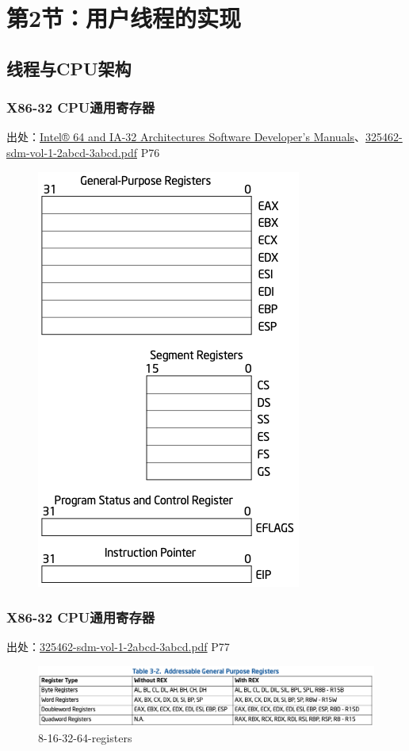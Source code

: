 \section{第2节：用户线程的实现}%
% 
\subsection{线程与CPU架构}
% 
\begin{frame}[fragile]
    \frametitle{X86-32 CPU通用寄存器}
% 
% 
% 
出处：\href{https://software.intel.com/content/www/us/en/develop/articles/intel-sdm.html\#combined}{Intel® 64 and IA-32 Architectures Software Developer’s Manuals}、\href{https://software.intel.com/content/dam/develop/external/us/en/documents-tps/325462-sdm-vol-1-2abcd-3abcd.pdf}{325462-sdm-vol-1-2abcd-3abcd.pdf} P76
% 
	\begin{figure}
		\centering
		\includegraphics[width=0.25\linewidth]{figs/x86-32-registers.png}
	\end{figure}


% 
\end{frame}
\begin{frame}[fragile]
    \frametitle{X86-32 CPU通用寄存器}
% 
出处：\href{https://software.intel.com/content/dam/develop/external/us/en/documents-tps/325462-sdm-vol-1-2abcd-3abcd.pdf}{325462-sdm-vol-1-2abcd-3abcd.pdf} P77
% 
	\begin{figure}
		\centering
		\includegraphics[width=1.0\linewidth]{figs/8-16-32-64-registers.png}
		\caption{8-16-32-64-registers}
	\end{figure}


% 
\end{frame}
